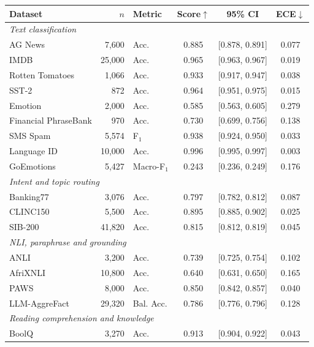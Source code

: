 \begin{tabular}{l r l c c c}
    \toprule
    Dataset & $n$ & Metric & Score$\uparrow$ & 95\% CI & ECE$\downarrow$ \\
    \midrule
    \multicolumn{6}{l}{\textit{Text classification}} \\
    AG News & 7{,}600 & Acc. & 0.885 & [0.878, 0.891] & 0.077 \\
    \rowcolor{gray!10}IMDB & 25{,}000 & Acc. & 0.965 & [0.963, 0.967] & 0.019 \\
    Rotten Tomatoes & 1{,}066 & Acc. & 0.933 & [0.917, 0.947] & 0.038 \\
    \rowcolor{gray!10}SST-2 & 872 & Acc. & 0.964 & [0.951, 0.975] & 0.015 \\
    Emotion & 2{,}000 & Acc. & 0.585 & [0.563, 0.605] & 0.279 \\
    \rowcolor{gray!10}Financial PhraseBank & 970 & Acc. & 0.730 & [0.699, 0.756] & 0.138 \\
    SMS Spam & 5{,}574 & F$_\text{1}$ & 0.938 & [0.924, 0.950] & 0.033 \\
    \rowcolor{gray!10}Language ID & 10{,}000 & Acc. & 0.996 & [0.995, 0.997] & 0.003 \\
    GoEmotions & 5{,}427 & Macro-F$_\text{1}$ & 0.243 & [0.236, 0.249] & 0.176 \\
    \midrule
    \multicolumn{6}{l}{\textit{Intent and topic routing}} \\
    Banking77 & 3{,}076 & Acc. & 0.797 & [0.782, 0.812] & 0.087 \\
    \rowcolor{gray!10}CLINC150 & 5{,}500 & Acc. & 0.895 & [0.885, 0.902] & 0.025 \\
    SIB-200 & 41{,}820 & Acc. & 0.815 & [0.812, 0.819] & 0.045 \\
    \midrule
    \multicolumn{6}{l}{\textit{NLI, paraphrase and grounding}} \\
    ANLI & 3{,}200 & Acc. & 0.739 & [0.725, 0.754] & 0.102 \\
    \rowcolor{gray!10}AfriXNLI & 10{,}800 & Acc. & 0.640 & [0.631, 0.650] & 0.165 \\
    PAWS & 8{,}000 & Acc. & 0.850 & [0.842, 0.857] & 0.040 \\
    \rowcolor{gray!10}LLM-AggreFact & 29{,}320 & Bal. Acc. & 0.786 & [0.776, 0.796] & 0.128 \\
    \midrule
    \multicolumn{6}{l}{\textit{Reading comprehension and knowledge}} \\
    BoolQ & 3{,}270 & Acc. & 0.913 & [0.904, 0.922] & 0.043 \\

\end{tabular}
